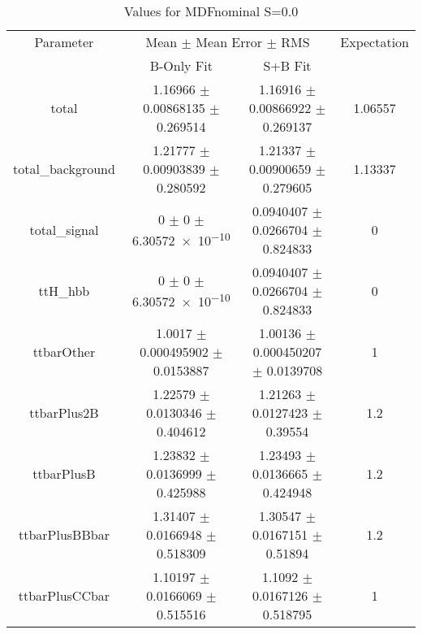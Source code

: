 \begin{table}
\centering
\caption{Values for MDFnominal S=0.0}
\begin{tabular}{cccc}
\toprule
Parameter & \multicolumn{2}{c}{Mean $\pm$ Mean Error $\pm$ RMS} & Expectation\\
 & B-Only Fit & S+B Fit & \\
\midrule
total & \num{1.16966} $\pm$ \num{0.00868135} $\pm$ \num{0.269514} & \num{1.16916} $\pm$ \num{0.00866922} $\pm$ \num{0.269137} & \num{1.06557}\\
total\_background & \num{1.21777} $\pm$ \num{0.00903839} $\pm$ \num{0.280592} & \num{1.21337} $\pm$ \num{0.00900659} $\pm$ \num{0.279605} & \num{1.13337}\\
total\_signal & \num{0} $\pm$ \num{0} $\pm$ \num{6.30572e-10} & \num{0.0940407} $\pm$ \num{0.0266704} $\pm$ \num{0.824833} & \num{0}\\
ttH\_hbb & \num{0} $\pm$ \num{0} $\pm$ \num{6.30572e-10} & \num{0.0940407} $\pm$ \num{0.0266704} $\pm$ \num{0.824833} & \num{0}\\
ttbarOther & \num{1.0017} $\pm$ \num{0.000495902} $\pm$ \num{0.0153887} & \num{1.00136} $\pm$ \num{0.000450207} $\pm$ \num{0.0139708} & \num{1}\\
ttbarPlus2B & \num{1.22579} $\pm$ \num{0.0130346} $\pm$ \num{0.404612} & \num{1.21263} $\pm$ \num{0.0127423} $\pm$ \num{0.39554} & \num{1.2}\\
ttbarPlusB & \num{1.23832} $\pm$ \num{0.0136999} $\pm$ \num{0.425988} & \num{1.23493} $\pm$ \num{0.0136665} $\pm$ \num{0.424948} & \num{1.2}\\
ttbarPlusBBbar & \num{1.31407} $\pm$ \num{0.0166948} $\pm$ \num{0.518309} & \num{1.30547} $\pm$ \num{0.0167151} $\pm$ \num{0.51894} & \num{1.2}\\
ttbarPlusCCbar & \num{1.10197} $\pm$ \num{0.0166069} $\pm$ \num{0.515516} & \num{1.1092} $\pm$ \num{0.0167126} $\pm$ \num{0.518795} & \num{1}\\
\bottomrule
\end{tabular}
\end{table}
